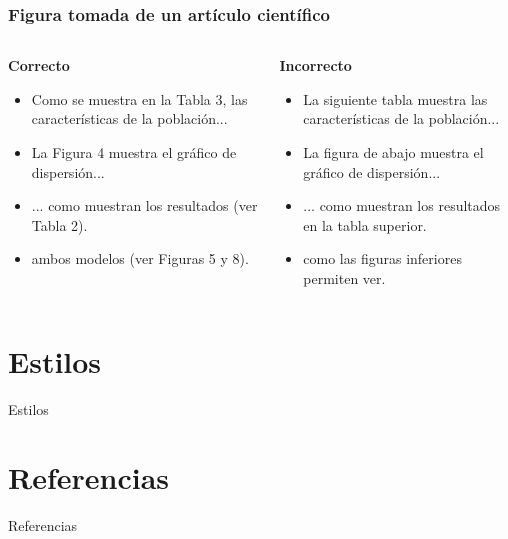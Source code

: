 \documentclass[
11pt, %
]{beamer}
\begin{document}
\begin{frame}
	\frametitle{Figura tomada de un artículo científico}

	\begin{columns}[c] %
		\begin{column}{0.5\textwidth} %
			\textbf{Correcto}

			\begin{itemize}
				\item 	Como se muestra en la Tabla 3, las características de la población...
				\item 	La Figura 4 muestra el gráfico de dispersión...
				\item 	... como muestran los resultados (ver Tabla 2).
				\item 	ambos modelos (ver Figuras 5 y 8).
			\end{itemize}

		\end{column}
		\begin{column}{0.5\textwidth} %
			\textbf{Incorrecto}

			\begin{itemize}
				\item 	La siguiente tabla muestra las características de la población...
				\item 	La figura de abajo muestra el gráfico de dispersión...
				\item 	... como muestran los resultados en la tabla superior.
				\item 	como las figuras inferiores permiten ver.
			\end{itemize}

		\end{column}
	\end{columns}

\end{frame}

\section{Estilos}
\begin{frame}{Estilos}

\end{frame}

\section{Referencias}
\begin{frame}{Referencias}

\end{frame}
\end{document}
